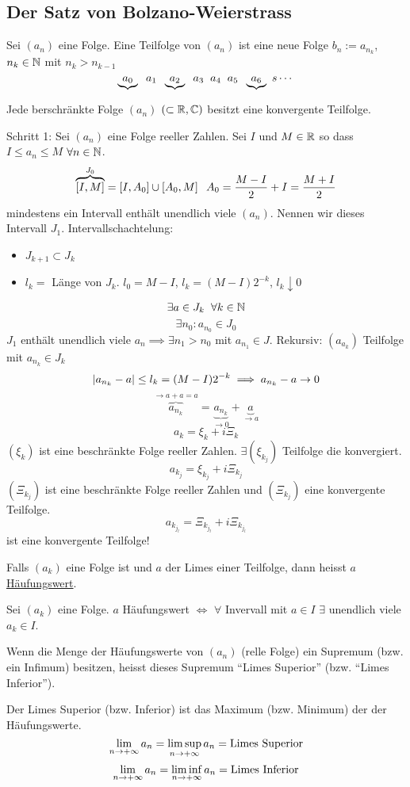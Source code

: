 \subsection{Der Satz von Bolzano-Weierstrass}
\begin{Def}
  Sei $(a_n)$ eine Folge. Eine Teilfolge von $(a_n)$ ist eine neue Folge $b_n:= a_{n_k}$, $n_k\in\mathbb{N}$ mit $n_k>n_{k-1}$
  \[\underbrace{a_0}\hspace{2mm} a_1\hspace{2mm}\underbrace{a_2}\hspace{2mm} a_3\hspace{2mm} a_4 \hspace{2mm} a_5 \hspace{2mm}\underbrace{a_6}\ s \cdots\]
\end{Def}
\begin{Sat}
  Jede berschränkte Folge $(a_n)$ $(\subset\mathbb{R}, \mathbb{C})$ besitzt eine konvergente Teilfolge.
\end{Sat}
\begin{Bew}
  Schritt 1: Sei $(a_n)$ eine Folge reeller Zahlen. Sei $I$ und $M\in\mathbb{R}$ so dass $I\leq a_n\leq M$ $\forall n\in\mathbb{N}$.
  \[\overbrace{\left[ I,M \right]}^{J_0}=\left[ I,A_0 \right]\cup \left[ A_0, M \right]\hspace{2mm} A_0=\frac{M-I}{2}+I=\frac{M+I}{2}\]
  mindestens ein Intervall enthält unendlich viele $(a_n)$. Nennen wir dieses Intervall $J_1$.
  Intervallschachtelung:
  \begin{itemize}
    \item $J_{k+1}\subset J_k$
    \item $l_k=$ Länge von $J_k$. $l_0=M-I$, $l_k=(M-I)2^{-k}$, $l_k\downarrow 0$
  \end{itemize}
  \[\exists a\in J_k\hspace{2mm}\forall k\in\mathbb{N}\]
  \[\exists n_0: a_{n_0}\in J_0\]
  $J_1$ enthält unendlich viele $a_n\implies \exists n_1>n_0$ mit $a_{n_1}\in J$. Rekursiv: $(a_{a_k})$ Teilfolge mit $a_{n_k}\in J_k$
  \[\mathopen| a_{n_k}-a \mathclose|\leq l_k=(M-I)2^{-k}\implies a_{n_k}-a\to 0\]
  \[\overbrace{a_{n_k}}^{\to a+a=a}=\underbrace{a_{n_k}}_{\to 0}+\underbrace{a}_{\to a}\]
  \[a_k=\xi_k+i\Xi_k\]
  $(\xi_k)$ ist eine beschränkte Folge reeller Zahlen. $\exists (\xi_{k_j})$ Teilfolge die konvergiert.
  \[a_{k_j}=\xi_{k_j}+i\Xi_{k_j}\]
  $(\Xi_{k_j})$ ist eine beschränkte Folge reeller Zahlen und $(\Xi_{k_j})$ eine konvergente Teilfolge.
  \[a_{k_{j_l}}=\Xi_{k_{j_l}}+i\Xi_{k_{j_l}}\]
  ist eine konvergente Teilfolge!
\end{Bew}
\begin{Def}
  Falls $(a_k)$ eine Folge ist und $a$ der Limes einer Teilfolge, dann heisst $a$ \ul{Häufungswert}.
\end{Def}
\begin{Lem}
  Sei $(a_k)$ eine Folge. $a$ Häufungswert $\iff$ $\forall$ Invervall mit $a\in I$ $\exists$ unendlich viele $a_k\in I$.
\end{Lem}
\begin{Def}
  Wenn die Menge der Häufungswerte von $(a_n)$ (relle Folge) ein Supremum (bzw. ein Infimum) besitzen, heisst dieses Supremum ``Limes Superior'' (bzw. ``Limes Inferior'').
\end{Def}
\begin{Lem}
  Der Limes Superior (bzw. Inferior) ist das Maximum (bzw. Minimum) der der Häufungswerte.
  \[\displaystyle\lim_{n\to+\infty}a_n=\limsup_{n\to+\infty} a_n=\text{Limes Superior}\]
  \[\displaystyle\lim_{n\to+\infty}a_n=\liminf_{n\to+\infty} a_n=\text{Limes Inferior}\]
\end{Lem}
